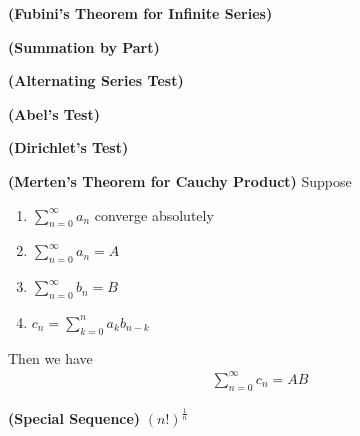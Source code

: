 \documentclass{report}
\begin{document}
\begin{theorem}
\textbf{(Fubini's Theorem for Infinite Series)}
\end{theorem}
\begin{mdframed}

\end{mdframed}
\begin{theorem}
\textbf{(Summation by Part)}
\end{theorem}
\begin{mdframed}

\end{mdframed}
\begin{theorem}
\textbf{(Alternating Series Test)}
\end{theorem}
\begin{theorem}
\textbf{(Abel's Test)}
\end{theorem}
\begin{theorem}
\textbf{(Dirichlet's Test)}
\end{theorem}
\begin{mdframed}

\end{mdframed}
\begin{theorem}
\label{Merten Cau}
\textbf{(Merten's Theorem for Cauchy Product)} Suppose 
\begin{enumerate}[label=(\alph*)]
  \item $\sum_{n=0}^\infty a_n$ converge absolutely 
  \item $\sum_{n=0}^\infty a_n=A$
  \item $\sum_{n=0}^\infty b_n=B$ 
  \item $c_n=\sum_{k=0}^n a_kb_{n-k}$
\end{enumerate}
Then we have 
\begin{align*}
\sum_{n=0}^{\infty}c_n=AB
\end{align*}
\end{theorem}
\begin{mdframed}

\end{mdframed}
\begin{theorem}
\textbf{(Special Sequence)} $(n!)^{\frac{1}{n}}$
\end{theorem}
\end{document}
